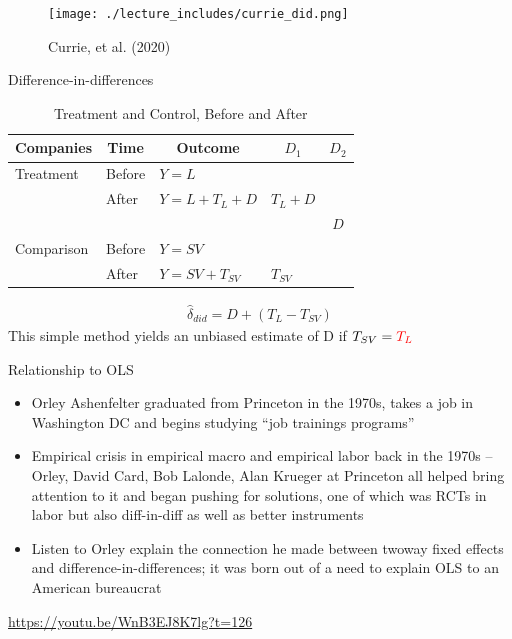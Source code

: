 \documentclass{beamer}
\begin{document}
\begin{frame}

	\begin{figure}
	\caption{Currie, et al. (2020)}
	\texttt{[image: ./lecture\_includes/currie\_did.png]}
	\end{figure}


\end{frame}


\begin{frame}{Difference-in-differences}

\begin{table}\centering
		\caption{Treatment and Control, Before and After}
		\begin{center}
		\begin{tabular}{lll|lc}
		\toprule
		\multicolumn{1}{l}{\textbf{Companies}}&
		\multicolumn{1}{c}{\textbf{Time}}&
		\multicolumn{1}{c}{\textbf{Outcome}}&
		\multicolumn{1}{c}{$D_1$}&
		\multicolumn{1}{c}{$D_2$}\\
		\midrule
		Treatment & Before & $Y=L$ \\
		& After & $Y=L + T_L + D$ & $T_L+D$\\
		\midrule
		& & & & $D$ \\
		\midrule
		Comparison & Before & $Y=SV$ \\
		& After & $Y=SV + T_{SV}$ & $T_{SV}$\\
		\bottomrule
		\end{tabular}
		\end{center}
	\end{table}

\begin{eqnarray*}
\widehat{\delta}_{did} = D + (T_L - T_{SV})
\end{eqnarray*}This simple method yields an unbiased estimate of D if $T_{SV} = \textcolor{red}{T_L}$

\end{frame}


\begin{frame}{Relationship to OLS}

\begin{itemize}
\item Orley Ashenfelter graduated from Princeton in the 1970s, takes a job in Washington DC and begins studying ``job trainings programs''
\item Empirical crisis in empirical macro and empirical labor back in the 1970s -- Orley, David Card, Bob Lalonde, Alan Krueger at Princeton all helped bring attention to it and began pushing for solutions, one of which was RCTs in labor but also diff-in-diff as well as better instruments
\item Listen to Orley explain the connection he made between twoway fixed effects and difference-in-differences; it was born out of a need to explain OLS to an American bureaucrat

\end{itemize}

\url{https://youtu.be/WnB3EJ8K7lg?t=126}

\end{frame}
\end{document}
